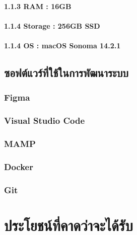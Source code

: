 \hspace{2.5cm}\hangindent=4.9cm\paragraph{1.1.3 RAM : 16GB}

\hspace{2.5cm}\hangindent=4.9cm\paragraph{1.1.4 Storage : 256GB SSD}

\hspace{2.5cm}\hangindent=4.9cm\paragraph{1.1.4 OS : macOS Sonoma 14.2.1 }


\hspace{0cm}\subsection{ซอฟต์แวร์ที่ใช้ในการพัฒนาระบบ}

\hspace{1cm}\subsubsection{Figma}

\hspace{1cm}\subsubsection{Visual Studio Code}

\hspace{1cm}\subsubsection{MAMP}

\hspace{1cm}\subsubsection{Docker}

\hspace{1cm}\subsubsection{Git}

\section{ประโยชน์ที่คาดว่าจะได้รับ}



